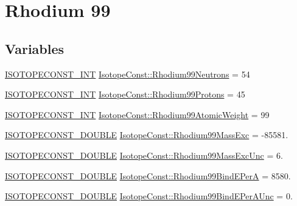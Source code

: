\hypertarget{group___isotope_const-_rhodium-_rh99}{}\section{Rhodium 99}
\label{group___isotope_const-_rhodium-_rh99}
\subsection*{Variables}
\begin{DoxyCompactItemize}
\item 
\mbox{\hyperlink{group___isotope_const-_macros_ga5f18360b3e99483a35c32d789e62621c}{I\+S\+O\+T\+O\+P\+E\+C\+O\+N\+S\+T\+\_\+\+I\+NT}} \mbox{\hyperlink{group___isotope_const-_rhodium-_rh99_ga3855f4ab0ba0ebdfed118a94df7e7c8a}{Isotope\+Const\+::\+Rhodium99\+Neutrons}} = 54
\item 
\mbox{\hyperlink{group___isotope_const-_macros_ga5f18360b3e99483a35c32d789e62621c}{I\+S\+O\+T\+O\+P\+E\+C\+O\+N\+S\+T\+\_\+\+I\+NT}} \mbox{\hyperlink{group___isotope_const-_rhodium-_rh99_ga856acb6f92fa83da36623713ac18e226}{Isotope\+Const\+::\+Rhodium99\+Protons}} = 45
\item 
\mbox{\hyperlink{group___isotope_const-_macros_ga5f18360b3e99483a35c32d789e62621c}{I\+S\+O\+T\+O\+P\+E\+C\+O\+N\+S\+T\+\_\+\+I\+NT}} \mbox{\hyperlink{group___isotope_const-_rhodium-_rh99_ga8e841c59837276b5a368868173d6310b}{Isotope\+Const\+::\+Rhodium99\+Atomic\+Weight}} = 99
\item 
\mbox{\hyperlink{group___isotope_const-_macros_ga8f45a7272ce02c0b4c65c44636ed719a}{I\+S\+O\+T\+O\+P\+E\+C\+O\+N\+S\+T\+\_\+\+D\+O\+U\+B\+LE}} \mbox{\hyperlink{group___isotope_const-_rhodium-_rh99_ga7954426193fc2316bc047005fba67513}{Isotope\+Const\+::\+Rhodium99\+Mass\+Exc}} = -\/85581.
\item 
\mbox{\hyperlink{group___isotope_const-_macros_ga8f45a7272ce02c0b4c65c44636ed719a}{I\+S\+O\+T\+O\+P\+E\+C\+O\+N\+S\+T\+\_\+\+D\+O\+U\+B\+LE}} \mbox{\hyperlink{group___isotope_const-_rhodium-_rh99_gab2613ebd2253d2cae677561e1a05a273}{Isotope\+Const\+::\+Rhodium99\+Mass\+Exc\+Unc}} = 6.
\item 
\mbox{\hyperlink{group___isotope_const-_macros_ga8f45a7272ce02c0b4c65c44636ed719a}{I\+S\+O\+T\+O\+P\+E\+C\+O\+N\+S\+T\+\_\+\+D\+O\+U\+B\+LE}} \mbox{\hyperlink{group___isotope_const-_rhodium-_rh99_ga0d032785185e4819ffc9bd03a9446163}{Isotope\+Const\+::\+Rhodium99\+Bind\+E\+PerA}} = 8580.
\item 
\mbox{\hyperlink{group___isotope_const-_macros_ga8f45a7272ce02c0b4c65c44636ed719a}{I\+S\+O\+T\+O\+P\+E\+C\+O\+N\+S\+T\+\_\+\+D\+O\+U\+B\+LE}} \mbox{\hyperlink{group___isotope_const-_rhodium-_rh99_gaa27eeaa5605e406a9bccbafeb2d09dc7}{Isotope\+Const\+::\+Rhodium99\+Bind\+E\+Per\+A\+Unc}} = 0.

\end{DoxyCompactItemize}
